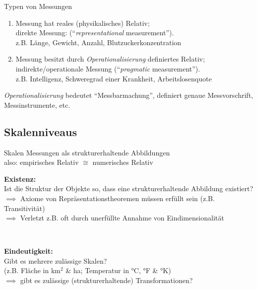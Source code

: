 \documentclass[
  10pt,
  ignorenonframetext,
]{beamer}
\providecommand{\tightlist}{%
  \setlength{\itemsep}{0pt}\setlength{\parskip}{0pt}}
\begin{document}
\begin{frame}{Typen von Messungen}
\label{typen-von-messungen}
\begin{enumerate}
\tightlist
\item
  Messung hat reales (physikalisches) Relativ;\\
  direkte Messung: (``\emph{representational} measurement'').\\
  z.B. Länge, Gewicht, Anzahl, Blutzuckerkonzentration
\item
  Messung besitzt durch \emph{Operationalisierung} definiertes
  Relativ;\\
  indirekte/operationale Messung (``\emph{pragmatic} measurement'').\\
  z.B. Intelligenz, Schweregrad einer Krankheit, Arbeitslosenquote
\end{enumerate}

\emph{Operationalisierung} bedeutet ``Messbarmachung'', definiert genaue
Messvorschrift, Messinstrumente, etc.
\end{frame}

\subsection{Skalenniveaus}\label{skalenniveaus}

\begin{frame}{Skalen}
\label{skalen}
Messungen als strukturerhaltende Abbildungen\\
also: empirisches Relativ \(\cong\) numerisches Relativ ~

\textbf{Existenz:}\\
Ist die Struktur der Objekte so, dass eine strukturerhaltende Abbildung
existiert?\\
\(\implies\) Axiome von Repräsentationstheoremen müssen erfüllt sein
(z.B. Transitivität)\\
\(\implies\) Verletzt z.B. oft durch unerfüllte Annahme von
Eindimensionalität

~

\textbf{Eindeutigkeit:}\\
Gibt es mehrere zulässige Skalen?\\
(z.B. Fläche in km\(^2\) \& ha; Temperatur in °C, °F \& °K)\\
\(\implies\) gibt es zulässige (strukturerhaltende) Transformationen?
\end{frame}
\end{document}
